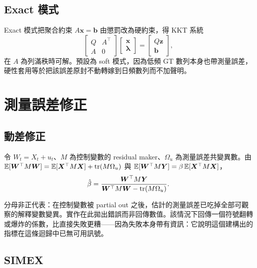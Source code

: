 \documentclass[12pt,a4paper,oneside]{article}
\begin{document}
\subsection{Exact 模式}

Exact 模式把聚合約束 $A\bm{x}=\bm{b}$ 由懲罰改為硬約束，得 KKT 系統
\begin{equation}
\begin{bmatrix} Q & A^\top\\ A & 0\end{bmatrix}
\begin{bmatrix}\bm{x}\\ \bm{\lambda}\end{bmatrix}
=
\begin{bmatrix}Q\bm{z}\\ \bm{b}\end{bmatrix},
\end{equation}
在 $A$ 為列滿秩時可解。預設為 soft 模式，因為低頻 GT 數列本身也帶測量誤差，硬性套用等於把該誤差原封不動轉嫁到日頻數列而不加聲明。

\section{測量誤差修正}\label{app:eiv-zh}

\subsection{動差修正}\label{app:moment-zh}

令 $W_t=X_t+u_t$、$M$ 為控制變數的 residual maker、$\Omega_u$ 為測量誤差共變異數。由
$\mathbb{E}[\bm{W}^\top M\bm{W}]=\mathbb{E}[\bm{X}^\top M\bm{X}]+\operatorname{tr}(M\Omega_u)$ 與
$\mathbb{E}[\bm{W}^\top M\bm{Y}]=\beta\,\mathbb{E}[\bm{X}^\top M\bm{X}]$，
\begin{equation}
\hat{\beta}=\frac{\bm{W}^\top M\bm{Y}}
{\bm{W}^\top M\bm{W}-\operatorname{tr}(M\Omega_u)}.
\end{equation}

\begin{remark}[分母本身就是診斷]
分母非正代表：在控制變數被 partial out 之後，估計的測量誤差已吃掉全部可觀察的解釋變數變異。實作在此拋出錯誤而非回傳數值。該情況下回傳一個符號翻轉或爆炸的係數，比直接失敗更糟——因為失敗本身帶有資訊：它說明這個建構出的指標在這條迴歸中已無可用訊號。
\end{remark}

\subsection{SIMEX}
\end{document}

